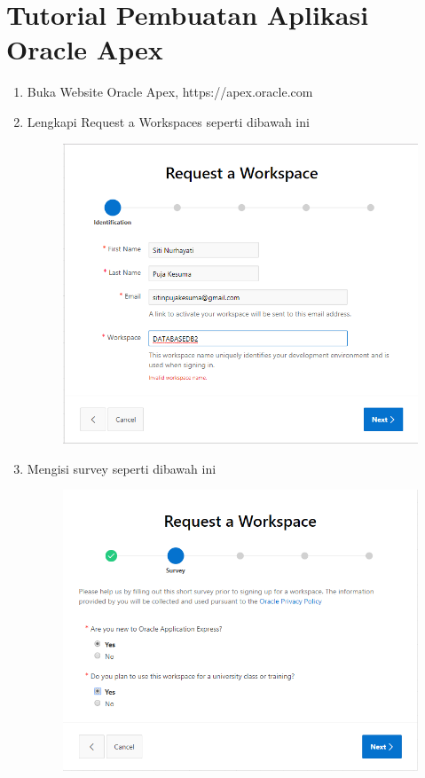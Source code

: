 \chapter*{Tutorial Pembuatan Aplikasi Oracle Apex}

\begin{enumerate}
	\item Buka Website Oracle Apex,  https://apex.oracle.com

	\item Lengkapi Request a Workspaces seperti dibawah ini 
	\begin{figure} [!htbp]
	\includegraphics[scale=0.2]{Apex/3.png}
	\centering
	\end{figure}

	\item Mengisi survey seperti dibawah ini 
	\begin{figure} [!htbp]
	\includegraphics[scale=0.2]{Apex/4.png}
	\centering
	\end{figure}
	

\end{enumerate}
